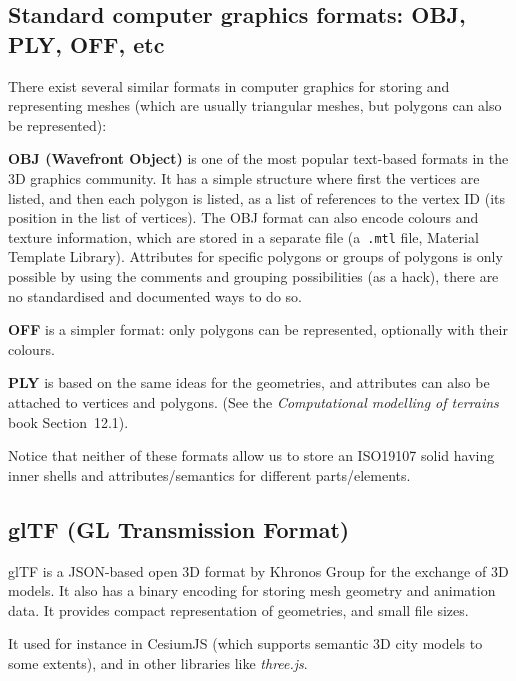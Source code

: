 \subsection{Standard computer graphics formats: OBJ, PLY, OFF, etc}

There exist several similar formats in computer graphics for storing and representing meshes (which are usually triangular meshes, but polygons can also be represented):

\textbf{OBJ (Wavefront Object)} is one of the most popular text-based formats in the 3D graphics community.
It has a simple structure where first the vertices are listed, and then each polygon is listed, as a list of references to the vertex ID (its position in the list of vertices).
The OBJ format can also encode colours and texture information, which are stored in a separate file (a~\texttt{.mtl} file, Material Template Library).
Attributes for specific polygons or groups of polygons is only possible by using the comments and grouping possibilities (as a hack), there are no standardised and documented ways to do so.

\textbf{OFF} is a simpler format: only polygons can be represented, optionally with their colours.

\textbf{PLY} is based on the same ideas for the geometries, and attributes can also be attached to vertices and polygons. (See the \emph{Computational modelling of terrains} book Section~12.1).

Notice that neither of these formats allow us to store an ISO19107 solid having inner shells and attributes/semantics for different parts/elements.


\subsection{glTF (GL Transmission Format)}
glTF is a JSON-based open 3D format by Khronos Group for the exchange of 3D models.
It also has a binary encoding for storing mesh geometry and animation data.
It provides compact representation of geometries, and small file sizes.

It used for instance in CesiumJS (which supports semantic 3D city models to some extents), and in other libraries like \emph{three.js}.

